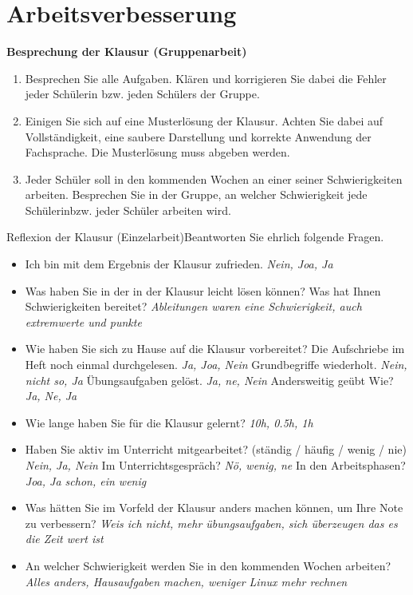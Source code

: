 \documentclass{book}
\begin{document}
\section{Arbeitsverbesserung}

\textbf{Besprechung der Klausur (Gruppenarbeit)}

\begin{enumerate}
  \item Besprechen Sie alle Aufgaben. Klären und korrigieren Sie dabei die
    Fehler jeder Schülerin bzw. jeden Schülers der Gruppe.
  \item Einigen Sie sich auf eine Musterlösung der Klausur. Achten Sie dabei
    auf Vollständigkeit, eine saubere Darstellung und korrekte Anwendung der
    Fachsprache. Die Musterlösung muss abgeben werden.
  \item Jeder Schüler soll in den kommenden Wochen an einer seiner
    Schwierigkeiten arbeiten. Besprechen Sie in der Gruppe, an welcher
    Schwierigkeit jede Schülerinbzw. jeder Schüler arbeiten wird.
\end{enumerate}

Reflexion der Klausur (Einzelarbeit)Beantworten Sie ehrlich folgende Fragen.

\begin{itemize}
  \item Ich bin mit dem Ergebnis der Klausur zufrieden. 
    \subitem \textit{Nein, Joa, Ja}

  \item Was haben Sie in der in der Klausur leicht lösen können? Was hat Ihnen
    Schwierigkeiten bereitet?
    \subitem \textit{Ableitungen waren eine Schwierigkeit, auch extremwerte und punkte}

  \item Wie haben Sie sich zu Hause auf die Klausur vorbereitet?
    \subitem Die Aufschriebe im Heft noch einmal durchgelesen. \textit{Ja, Joa, Nein}
    \subitem Grundbegriffe wiederholt. \textit{Nein, nicht so, Ja}
    \subitem Übungsaufgaben gelöst. \textit{Ja, ne, Nein}
    \subitem Andersweitig ge\"ubt Wie? \textit{Ja, Ne, Ja}

  \item Wie lange haben Sie für die Klausur gelernt? \textit{10h, 0.5h, 1h}

  \item Haben Sie aktiv im Unterricht mitgearbeitet? (ständig / häufig / wenig / nie) \textit{Nein, Ja, Nein}
    \subitem Im Unterrichtsgespräch? \textit{N\"o, wenig, ne}
    \subitem In den Arbeitsphasen? \textit{Joa, Ja schon, ein wenig}

  \item Was hätten Sie im Vorfeld der Klausur anders machen können, um Ihre Note zu verbessern?
    \subitem \textit{Weis ich nicht, mehr \"ubungsaufgaben, sich \"uberzeugen das es die Zeit wert ist}

  \item An welcher Schwierigkeit werden Sie in den kommenden Wochen arbeiten?
    \subitem \textit{Alles anders, Hausaufgaben machen, weniger Linux mehr rechnen}
\end{itemize}
\end{document}
